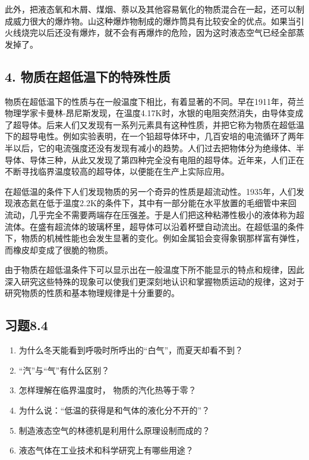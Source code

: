 此外，把液态氧和木屑、煤烟、萘以及其他容易氧化的物质混合在一起，还可以制成威力很大的爆炸物。山这种爆炸物制成的爆炸筒具有比较安全的优点。如果当引火线烧完以后还没有爆炸，就不会有再爆炸的危险，因为这时液态空气已经全部蒸发掉了。

\subsection{4.
物质在超低温下的特殊性质}\label{ux7269ux8d28ux5728ux8d85ux4f4eux6e29ux4e0bux7684ux7279ux6b8aux6027ux8d28}

物质在超低温下的性质与在一般温度下相比，有着显著的不同。早在1911年，荷兰物理学家卡曼林-昂尼斯发现，在温度4.17K时，水银的电阻突然消失，由导体变成了超导体。后来人们又发现有一系列元素具有这种性质，并把它称为物质在超低温下的超导电性。例如实验表明，在一个铅超导体环中，几百安培的电流循环了两年半以后，它的电流强度还没有发现有减小的趋势。人们过去把物体分为绝缘体、半导体、导体三种，从此又发现了第四种完全没有电阻的超导体。近年来，人们正在不断寻找临界温度较高的超导体，以便能在生产上实际应用。

在超低温的条件下人们发现物质的另一个奇异的性质是超流动性。1935年，人们发现液态氦在低于温度2.2K的条件下，其中有一部分能在水平放置的毛细管中来回流动，几乎完全不需要两端存在压强差。于是人们把这种粘滞性极小的液体称为超流体。在盛有超流体的玻璃杯里，超导体可以沿着杯壁自动流出。在超低温的条件下，物质的机械性能也会发生显著的变化。例如金属铅会变得象钢那样富有弹性，而橡皮却变成了很脆的物质。

由于物质在超低温条件下可以显示出在一般温度下所不能显示的特点和规律，因此深入研究这些特殊的现象可以使我们更深刻地认识和掌握物质运动的规律，这对于研究物质的性质和基本物理规律是十分重要的。

\subsection{习题8.4}\label{ux4e60ux98988.4}

\begin{enumerate}
\def\labelenumi{\arabic{enumi}.}
\item
  为什么冬天能看到呼吸时所呼出的``白气''，而夏天却看不到？
\item
  ``汽''与``气''有什么区别？
\item
  怎样理解在临界温度时， 物质的汽化热等于零？
\item
  为什么说：``低温的获得是和气体的液化分不开的''？
\item
  制造液态空气的林德机是利用什么原理设制而成的？
\item
  液态气体在工业技术和科学研究上有哪些用途？
\end{enumerate}

